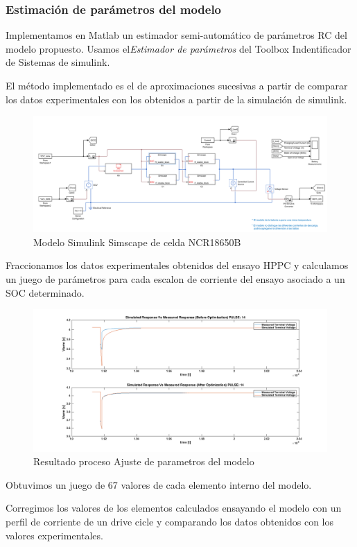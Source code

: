 \documentclass[10pt]{beamer}
\theoremstyle{remark}
\theoremstyle{definition}
\begin{document}
\begin{frame}[allowframebreaks]
\frametitle{Estimación de parámetros del modelo}

Implementamos en Matlab un estimador semi-automático de parámetros RC del modelo propuesto. Usamos el\emph{Estimador de parámetros} del Toolbox Indentificador de Sistemas de simulink.

 El método implementado es el de aproximaciones sucesivas a partir de comparar los datos experimentales con los obtenidos a partir de la simulación de simulink.

\begin{figure}
	\centering
	\includegraphics[width=0.9\linewidth]{images/Modelo_celda_simulink.png}
	\caption{Modelo Simulink Simscape de celda  NCR18650B }
	\label{fig:simulink_celda}
\end{figure}

Fraccionamos los datos experimentales obtenidos del ensayo HPPC y calculamos un juego de parámetros para cada escalon de corriente del ensayo asociado a un SOC determinado.

\begin{figure}
	\centering
	\includegraphics[width=0.9\linewidth]{images/Optimizacion.png}
	\caption{Resultado proceso Ajuste de parametros del modelo}
	\label{fig:RC_Opt}
\end{figure}

Obtuvimos un juego de 67 valores de cada elemento interno del modelo.


Corregimos los valores de los elementos calculados ensayando el modelo con un perfil de corriente de un drive cicle y comparando los datos obtenidos con los valores experimentales.


\end{frame}
\end{document}
